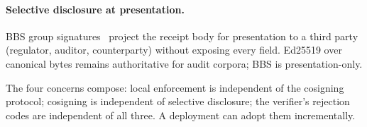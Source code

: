 \paragraph{Selective disclosure at presentation.} BBS group signatures~\cite{boneh2004bbs,bbsDraft,etsiSelectiveDisclosure2025} project the receipt body for presentation to a third party (regulator, auditor, counterparty) without exposing every field. Ed25519 over canonical bytes remains authoritative for audit corpora; BBS is presentation-only.

The four concerns compose: local enforcement is independent of the cosigning protocol; cosigning is independent of selective disclosure; the verifier's rejection codes are independent of all three. A deployment can adopt them incrementally.
